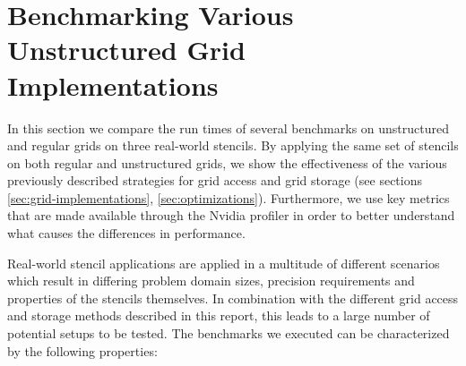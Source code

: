 \section{Benchmarking Various Unstructured Grid Implementations}	\label{sec:results}

In this section we compare the run times of several benchmarks on unstructured and regular grids on three real-world stencils. By applying the same set of stencils on both regular and unstructured grids, we show the effectiveness of the various previously described strategies for grid access and grid storage (see sections \ref{sec:grid-implementations}, \ref{sec:optimizations}). Furthermore, we use key metrics that are made available through the Nvidia profiler in order to better understand what causes the differences in performance.

Real-world stencil applications are applied in a multitude of different scenarios which result in differing problem domain sizes, precision requirements and properties of the stencils themselves. In combination with the different grid access and storage methods described in this report, this leads to a large number of potential setups to be tested. The benchmarks we executed can be characterized by the following properties:

